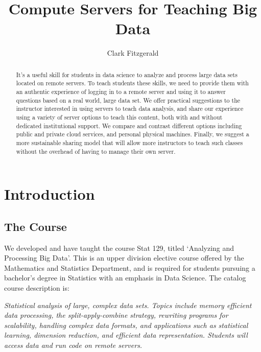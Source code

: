\documentclass[12pt]{article}
\title{Compute Servers for Teaching Big Data}
\author{Clark Fitzgerald}
\begin{document}
\maketitle

\begin{abstract}

    It's a useful skill for students in data science to analyze and process large data sets located on remote servers.
    To teach students these skills, we need to provide them with an authentic experience of logging in to a remote server and using it to answer questions based on a real world, large data set.
    We offer practical suggestions to the instructor interested in using servers to teach data analysis, and share our experience using a variety of server options to teach this content, both with and without dedicated institutional support.
    We compare and contrast different options including public and private cloud services, and personal physical machines.
    Finally, we suggest a more sustainable sharing model that will allow more instructors to teach such classes without the overhead of having to manage their own server.

\end{abstract}


\section{Introduction}



\subsection{The Course}

We developed and have taught the course Stat 129, titled `Analyzing and Processing Big Data'.
This is an upper division elective course offered by the Mathematics and Statistics Department, and is required for students pursuing a bachelor's degree in Statistics with an emphasis in Data Science.
The catalog course description is:

\emph{
Statistical analysis of large, complex data sets. Topics include memory efficient data processing, the split-apply-combine strategy, rewriting programs for scalability, handling complex data formats, and applications such as statistical learning, dimension reduction, and efficient data representation. Students will access data and run code on remote servers.
}
\end{document}
